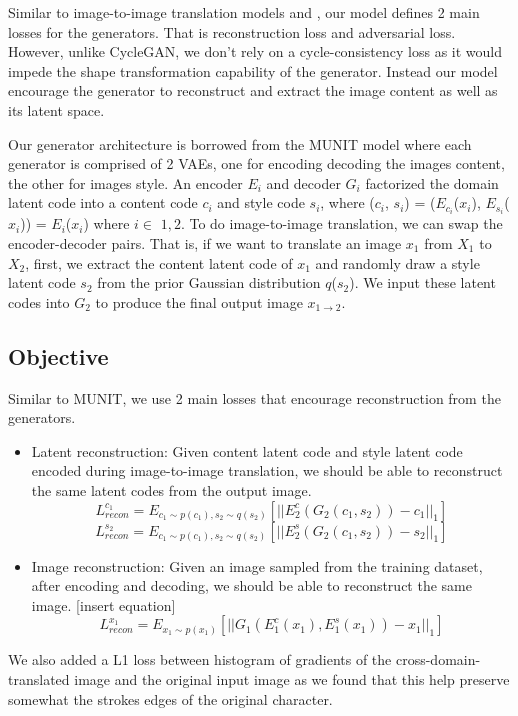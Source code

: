 \documentclass[12pt]{report}
\begin{document}
Similar to image-to-image translation models \cite{cycle-gan}\cite{bicycle-gan}\cite{disco-gan} and \cite{munit}, our model defines 2 main losses for the generators. That is reconstruction loss and adversarial loss. However, unlike CycleGAN, we don't rely on a cycle-consistency loss as it would impede the shape transformation capability of the generator. Instead our model encourage the generator to reconstruct and extract the image content as well as its latent space.

Our generator architecture is borrowed from the MUNIT model \cite{munit} where each generator is comprised of 2 VAEs, one for encoding decoding the images content, the other for images style. An encoder $E_i$ and decoder $G_i$ factorized the domain latent code into a content code $c_i$ and style code $s_i$, where ($c_i$, $s_i$) =  ($E_{c_i}$($x_i$), $E_{s_i}$($x_i$)) = $E_i$($x_i$) where $i \in$ ${1,2}$. To do image-to-image translation, we can swap the encoder-decoder pairs. That is, if we want to translate an image $x_1$ from $X_1$ to $X_2$, first, we extract the content latent code of $x_1$ and randomly draw a style latent code $s_2$ from the prior Gaussian distribution $q$($s_2$). We input these latent codes into $G_2$ to produce the final output image $x_{1\rightarrow2}$. 

\subsection{Objective}
Similar to MUNIT\cite{munit}, we use 2 main losses that encourage reconstruction from the generators.
\begin{itemize}
	\item Latent reconstruction: Given content latent code and style latent code encoded during image-to-image translation, we should be able to reconstruct the same latent codes from the output image.
\[L^{c_1}_{recon} = E_{{c_1}\sim p(c_1), s_2 \sim q(s_2)}[||E^c_2(G_2(c_1,s_2)) - c_1||_1]\]
\[L^{s_2}_{recon} = E_{{c_1}\sim p(c_1), s_2 \sim q(s_2)}[||E^s_2(G_2(c_1,s_2)) - s_2||_1]\]
	\item Image reconstruction: Given an image sampled from the training dataset, after encoding and decoding, we should be able to reconstruct the same image. [insert equation]
\[L^{x_1}_{recon} = E_{{x_1}\sim p(x_1)}[||G_1(E^c_1(x_1), E^s_1(x_1)) - x_1||_1]\]
\end{itemize}

We also added a L1 loss between histogram of gradients\cite{hog} of the cross-domain-translated image and the original input image as we found that this help preserve somewhat the strokes edges of the original character.
\end{document}
